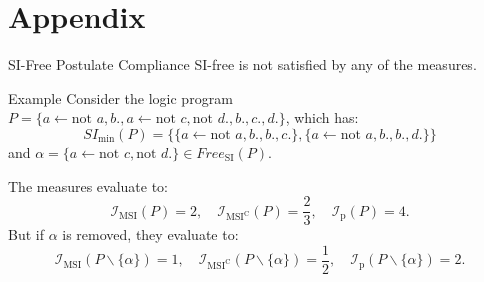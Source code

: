 \section{Appendix}

\begin{frame}{SI-Free Postulate Compliance}
    SI-free is not satisfied by any of the measures.
    \begin{exampleblock}{Example}
        Consider the logic program \(P = \{a \leftarrow \text{not } a, b., a \leftarrow \text{not }c, \text{not }d., b., c., d.\}\), which has:
        \[
            SI_{\min}(P) = \{\{a \leftarrow \text{not }a, b., b., c.\}, \{a \leftarrow \text{not }a, b., b., d.\}\}
        \]
        and \(\alpha = \{a \leftarrow \text{not }c, \text{not }d.\} \in Free_{\text{SI}}(P)\).

        The measures evaluate to:
        \[
            \mathcal{I}_{\text{MSI}}(P) = 2,\quad \mathcal{I}_{\text{MSI}^\text{C}}(P) = \frac{2}{3},\quad \mathcal{I}_{\text{p}}(P) = 4.
        \]
        But if \(\alpha\) is removed, they evaluate to:
        \[
            \mathcal{I}_{\text{MSI}}(P \backslash \{\alpha\}) = 1,\quad \mathcal{I}_{\text{MSI}^\text{C}}(P \backslash \{\alpha\}) = \frac{1}{2},\quad \mathcal{I}_{\text{p}}(P \backslash \{\alpha\}) = 2.
        \]
    \end{exampleblock}
\end{frame}